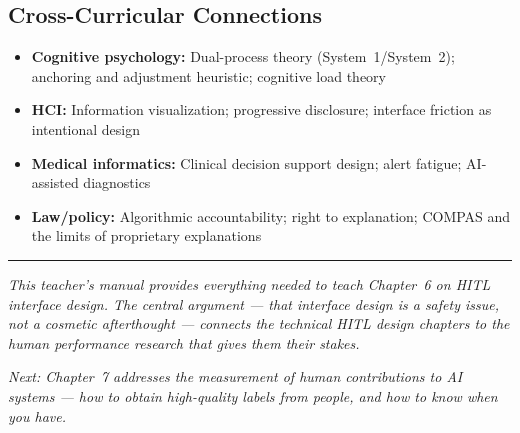 \subsection{Cross-Curricular Connections}
\begin{itemize}
    \item \textbf{Cognitive psychology:} Dual-process theory (System~1/System~2); anchoring and adjustment heuristic; cognitive load theory
    \item \textbf{HCI:} Information visualization; progressive disclosure; interface friction as intentional design
    \item \textbf{Medical informatics:} Clinical decision support design; alert fatigue; AI-assisted diagnostics
    \item \textbf{Law/policy:} Algorithmic accountability; right to explanation; COMPAS and the limits of proprietary explanations
\end{itemize}

\bigskip
\begin{center}
\rule{0.5\textwidth}{0.4pt}
\end{center}
\bigskip

\noindent\textit{This teacher's manual provides everything needed to teach Chapter~6 on HITL interface design. The central argument --- that interface design is a safety issue, not a cosmetic afterthought --- connects the technical HITL design chapters to the human performance research that gives them their stakes.}

\medskip
\noindent\textit{Next: Chapter~7 addresses the measurement of human contributions to AI systems --- how to obtain high-quality labels from people, and how to know when you have.}
